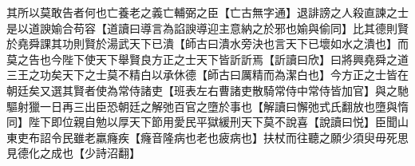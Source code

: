 其所以莫敢告者何也亡養老之義亡輔弼之臣【亡古無字通】退誹謗之人殺直諫之士是以道諛媮合苟容【道讀曰導言為諂諛導迎主意納之於邪也媮與偷同】比其德則賢於堯舜課其功則賢於湯武天下已潰【師古曰潰水旁決也言天下已壞如水之潰也】而莫之告也今陛下使天下舉賢良方正之士天下皆訢訢焉【訢讀曰欣】曰將興堯舜之道三王之功矣天下之士莫不精白以承休德【師古曰厲精而為潔白也】今方正之士皆在朝廷矣又選其賢者使為常侍諸吏【班表左右曹諸吏散騎常侍中常侍皆加官】與之馳驅射獵一日再三出臣恐朝廷之解弛百官之墮於事也【解讀曰懈弛式氏翻放也墮與惰同】陛下即位親自勉以厚天下節用愛民平獄緩刑天下莫不說喜【說讀曰悦】臣聞山東吏布詔令民雖老羸癃疾【癃音隆病也老也疲病也】扶杖而往聽之願少須臾毋死思見德化之成也【少詩沼翻】